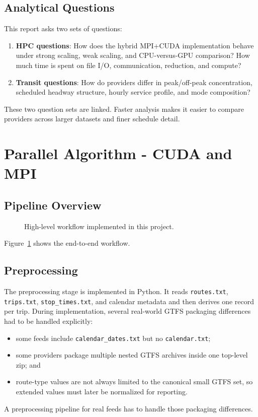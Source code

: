 \documentclass[sigconf,nonacm]{acmart}
\begin{document}
\subsection{Analytical Questions}
This report asks two sets of questions:
\begin{enumerate}[leftmargin=*]
  \item \textbf{HPC questions}: How does the hybrid MPI+CUDA implementation behave under strong scaling, weak scaling, and CPU-versus-GPU comparison? How much time is spent on file I/O, communication, reduction, and compute?
  \item \textbf{Transit questions}: How do providers differ in peak/off-peak concentration, scheduled headway structure, hourly service profile, and mode composition?
\end{enumerate}

These two question sets are linked. Faster analysis makes it easier to compare providers across larger datasets and finer schedule detail.

\section{Parallel Algorithm - CUDA and MPI}
\subsection{Pipeline Overview}
\begin{figure}[H]
  \centering
  \caption{High-level workflow implemented in this project.}
  \label{fig:pipeline}
\end{figure}

Figure~\ref{fig:pipeline} shows the end-to-end workflow.

\subsection{Preprocessing}
The preprocessing stage is implemented in Python. It reads \texttt{routes.txt}, \texttt{trips.txt}, \texttt{stop\_times.txt}, and calendar metadata and then derives one record per trip. During implementation, several real-world GTFS packaging differences had to be handled explicitly:
\begin{itemize}[leftmargin=*]
  \item some feeds include \texttt{calendar\_dates.txt} but no \texttt{calendar.txt};
  \item some providers package multiple nested GTFS archives inside one top-level zip; and
  \item route-type values are not always limited to the canonical small GTFS set, so extended values must later be normalized for reporting.
\end{itemize}
A preprocessing pipeline for real feeds has to handle those packaging differences.
\end{document}
